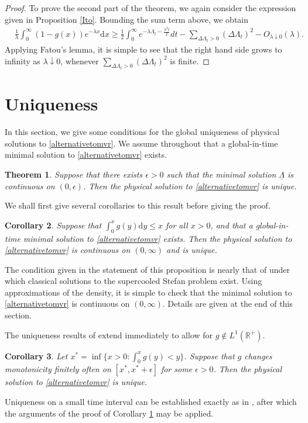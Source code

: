 \documentclass[11pt]{article}
\theoremstyle{plain}
\newtheorem{theorem}{Theorem}[section]
\newtheorem{corollary}[theorem]{Corollary}
\theoremstyle{remark}
\theoremstyle{definition}
\numberwithin{equation}{section}
\begin{document}
\begin{proof}
To prove the second part of the theorem, we again consider the expression given in Proposition \ref{Ito}. Bounding the sum term above, we obtain
\begin{align*}
    &\frac{1}{\lambda }\int_0^\infty (1-g(x))e^{-\lambda x}\textrm{d}x\geq \frac{1}{2}\int_0^\infty e^{-\lambda \Lambda_{t}-\frac{\lambda^2t}{2}}dt-\sum_{\Delta\Lambda_t>0}(\Delta\Lambda_t)^2-{}O_{\lambda \downarrow 0}(\lambda).
\end{align*}
Applying Fatou's lemma, it is simple to see that the right hand side grows to infinity as $\lambda\downarrow 0$, whenever $\sum_{\Delta\Lambda_t>0}(\Delta\Lambda_t)^2$ is finite.
\end{proof}


\section{Uniqueness}

\label{uniquenessappendix}
In this section, we give some conditions for the global uniqueness of physical solutions to \eqref{alternativetomvr}. We assume throughout that a global-in-time minimal solution to \eqref{alternativetomvr} exists.

\begin{theorem}
\label{contunique}
    Suppose that there exists $\epsilon>0$ such that the minimal solution $\underline{\Lambda}$ is continuous on $(0,\epsilon)$. Then the physical solution to \eqref{alternativetomvr} is unique.
\end{theorem}

We shall first give several corollaries to this result before giving the proof.

\begin{corollary}
\label{contunique2}
    Suppose that $\int_{0}^xg(y)\textrm{d}y\leq  x$ for all $x>0$, and that a global-in-time minimal solution to \eqref{alternativetomvr} exists. Then the physical solution to \eqref{alternativetomvr} is continuous on $(0,\infty)$ and is unique.
\end{corollary}

The condition given in the statement of this proposition is nearly that of \cite[Theorem 1.1]{PDEresult} under which classical solutions to the supercooled Stefan problem exist. Using approximations of the density, it is simple to check that the minimal solution to \eqref{alternativetomvr} is continuous on $(0,\infty)$. Details are given at the end of this section.

The uniqueness results of \cite{3} extend immediately to allow for $g\notin L^1(\mathbb{R}^+)$.
\begin{corollary}
    Let $x^*=\inf\{x>0:\int_0^xg(y)<y\}$. Suppose that $g$ changes monotonicity finitely often on $[x^*,x^*+\epsilon]$ for some $\epsilon>0$. Then the physical solution to \eqref{alternativetomvr} is unique.
\end{corollary}
Uniqueness on a small time interval can be established exactly as in \cite[Proposition 5.2]{3}, after which the arguments of the proof of Corollary \ref{contunique} may be applied.
\end{document}
